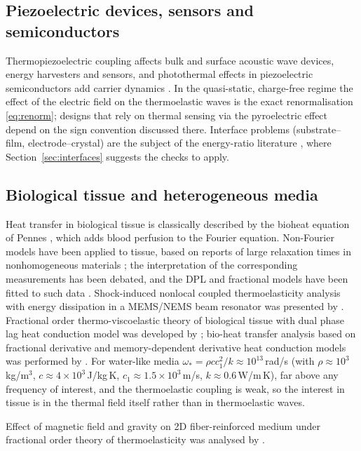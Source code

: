 \subsection{Piezoelectric devices, sensors and semiconductors}
Thermopiezoelectric coupling affects bulk and surface acoustic wave devices, energy harvesters and sensors, and photothermal effects in piezoelectric semiconductors add carrier dynamics \citep{Gupta2023,Gupta2024a,Gupta2026HeatMap}. In the quasi-static, charge-free regime the effect of the electric field on the thermoelastic waves is the exact renormalisation \eqref{eq:renorm}; designs that rely on thermal sensing via the pyroelectric effect depend on the sign convention discussed there. Interface problems (substrate--film, electrode--crystal) are the subject of the energy-ratio literature \citep{Barak2023IJP,Barak2023JTS,Gupta2023Energy,Kumar2024,Kumar2024a}, where Section~\ref{sec:interfaces} suggests the checks to apply.

\subsection{Biological tissue and heterogeneous media}
Heat transfer in biological tissue is classically described by the bioheat equation of Pennes \citep{Pennes1948}, which adds blood perfusion to the Fourier equation. Non-Fourier models have been applied to tissue, based on reports of large relaxation times in nonhomogeneous materials \citep{Kaminski1990,Mitra1995}; the interpretation of the corresponding measurements has been debated, and the DPL and fractional models have been fitted to such data \citep{vanDerMerwe2021,Yu2024}. Shock-induced nonlocal coupled thermoelasticity analysis with energy dissipation in a MEMS/NEMS beam resonator was presented by \citep{Hosseini2017}. Fractional order thermo-viscoelastic theory of biological tissue with dual phase lag heat conduction model was developed by \citep{Li2021}; bio-heat transfer analysis based on fractional derivative and memory-dependent derivative heat conduction models was performed by \citep{Zhang2021}. For water-like media $\omega_*=\rho cc_1^2/k\approx10^{13}$\,rad/s (with $\rho\approx10^3$\,kg/m$^3$, $c\approx4\times10^3$\,J/kg\,K, $c_1\approx1.5\times10^3$\,m/s, $k\approx0.6$\,W/m\,K), far above any frequency of interest, and the thermoelastic coupling is weak, so the interest in tissue is in the thermal field itself rather than in thermoelastic waves.

Effect of magnetic field and gravity on 2D fiber-reinforced medium under fractional order theory of thermoelasticity was analysed by \citep{Ma2020}.


